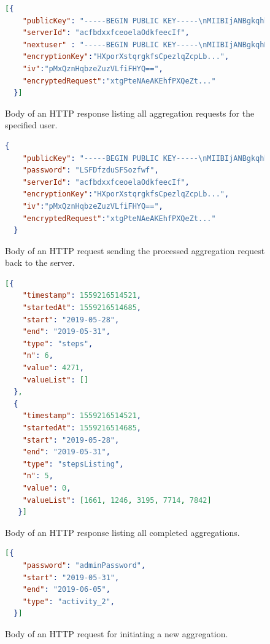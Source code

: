 \begin{figure}[h!]
  \begin{lstlisting}[language=json,firstnumber=1]
  [{
    "publicKey": "-----BEGIN PUBLIC KEY-----\nMIIBIjANBgkqhkiG...",
    "serverId": "acfbdxxfceoelaOdkfeecIf",
    "nextuser" : "-----BEGIN PUBLIC KEY-----\nMIIBIjANBgkqhBms...",
    "encryptionKey":"HXporXstqrgkfsCpezlqZcpLb...",
    "iv":"pMxQznHqbzeZuzVLfiFHYQ==",
    "encryptedRequest":"xtgPteNAeAKEhfPXQeZt..."
  }]
  \end{lstlisting}
  \caption{Body of an HTTP response listing all aggregation requests for the specified user.}
  \label{get-requests-response}
\end{figure}

\begin{figure}[h!]
  \begin{lstlisting}[language=json,firstnumber=1]
  {
    "publicKey": "-----BEGIN PUBLIC KEY-----\nMIIBIjANBgkqhkiG...",
    "password": "LSFDfzduSFSozfwf",
    "serverId": "acfbdxxfceoelaOdkfeecIf",
    "encryptionKey":"HXporXstqrgkfsCpezlqZcpLb...",
    "iv":"pMxQznHqbzeZuzVLfiFHYQ==",
    "encryptedRequest":"xtgPteNAeAKEhfPXQeZt..."
  }
  \end{lstlisting}
  \caption{Body of an HTTP request sending the processed aggregation request back to the server.}
  \label{post-request}
\end{figure}

\begin{figure}[h!]
  \begin{lstlisting}[language=json,firstnumber=1]
  [{
    "timestamp": 1559216514521,
    "startedAt": 1559216514685,
    "start": "2019-05-28",
    "end": "2019-05-31",
    "type": "steps",
    "n": 6,
    "value": 4271,
    "valueList": []
  },
  {
    "timestamp": 1559216514521,
    "startedAt": 1559216514685,
    "start": "2019-05-28",
    "end": "2019-05-31",
    "type": "stepsListing",
    "n": 5,
    "value": 0,
    "valueList": [1661, 1246, 3195, 7714, 7842]
   }]
  \end{lstlisting}
  \caption{Body of an HTTP response listing all completed aggregations.}
  \label{get-aggregations}
\end{figure}

\begin{figure}[h!]
  \begin{lstlisting}[language=json,firstnumber=1]
  [{
    "password": "adminPassword",
    "start": "2019-05-31",
    "end": "2019-06-05",
    "type": "activity_2",
  }]
  \end{lstlisting}
  \caption{Body of an HTTP request for initiating a new aggregation.}
  \label{insert-sample}
\end{figure}

